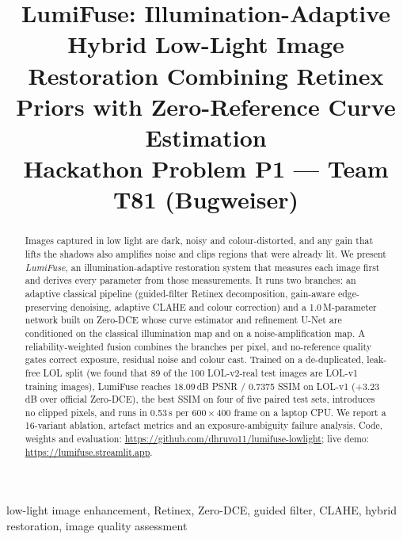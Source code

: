 \documentclass[conference]{IEEEtran}
\newcommand{\repo}{\url{https://github.com/dhruvo11/lumifuse-lowlight}}
\newcommand{\demo}{\url{https://lumifuse.streamlit.app}}
\begin{document}
\title{LumiFuse: Illumination-Adaptive Hybrid Low-Light Image Restoration Combining Retinex Priors with Zero-Reference Curve Estimation\\
\large Hackathon Problem P1 --- Team T81 (Bugweiser)}

\author{
\and
{}
}

\maketitle

\begin{abstract}
Images captured in low light are dark, noisy and colour-distorted, and any gain that lifts the shadows also amplifies
noise and clips regions that were already lit. We present \emph{LumiFuse}, an illumination-adaptive restoration
system that measures each image first and derives every parameter from those measurements. It runs two branches:
an adaptive classical pipeline (guided-filter Retinex decomposition, gain-aware edge-preserving denoising, adaptive
CLAHE and colour correction) and a 1.0\,M-parameter network built on Zero-DCE whose curve estimator and refinement
U-Net are conditioned on the classical illumination map and on a noise-amplification map. A reliability-weighted
fusion combines the branches per pixel, and no-reference quality gates correct exposure, residual noise and colour
cast. Trained on a de-duplicated, leak-free LOL split (we found that 89 of the 100 LOL-v2-real test images are
LOL-v1 training images), LumiFuse reaches 18.09\,dB PSNR / 0.7375 SSIM on LOL-v1 (+3.23\,dB over official Zero-DCE),
the best SSIM on four of five paired test sets, introduces no clipped pixels, and runs in 0.53\,s per
$600\times400$ frame on a laptop CPU. We report a 16-variant ablation, artefact metrics and an exposure-ambiguity
failure analysis. Code, weights and evaluation: \repo; live demo: \demo.
\end{abstract}

\begin{IEEEkeywords}
low-light image enhancement, Retinex, Zero-DCE, guided filter, CLAHE, hybrid restoration, image quality assessment
\end{IEEEkeywords}
\end{document}
